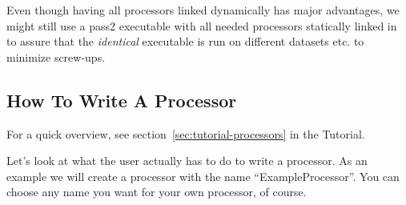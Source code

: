 \documentclass[12pt]{article}
\begin{document}
Even though having all processors linked dynamically has major
advantages, we might still use a pass2 executable with all needed
processors statically linked in to assure that the \emph{identical} executable
is run on different datasets etc. to minimize screw-ups.

\subsection{How To Write A Processor}
\label{sec:HowToWriteAProcessor}

For a quick overview, see section~\ref{sec:tutorial-processors} in the
Tutorial.

Let's look at what the user actually has to do to write a processor.  As
an example we will create a processor with the name
``ExampleProcessor''. You can choose any name you want for your own
processor, of course.
%
\end{document}
